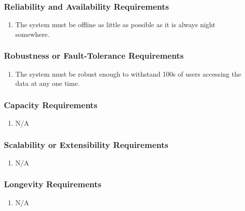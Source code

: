 \documentclass[]{article}
\begin{document}
\begin{enumerate}[{VP}1.]
\subsubsection{Reliability and Availability Requirements}
\label{ssub:reliability_and_availability_requirements}
\begin{enumerate}[{PR}1. ]
	\item The system must be offline as little as possible as it is always night somewhere.
\end{enumerate}

\subsubsection{Robustness or Fault-Tolerance Requirements}
\label{ssub:robustness_or_fault_tolerance_requirements}
\begin{enumerate}[{PR}1. ]
	\item The system must be robust enough to withstand 100s of users accessing the data at any one time.
\end{enumerate}

\subsubsection{Capacity Requirements}
\label{ssub:capacity_requirements}
\begin{enumerate}[{PR}1. ]
	\item N/A
\end{enumerate}

\subsubsection{Scalability or Extensibility Requirements}
\label{ssub:scalability_or_extensibility_requirements}
\begin{enumerate}[{PR}1. ]
	\item N/A
\end{enumerate}

\subsubsection{Longevity Requirements}
\label{ssub:longevity_requirements}
\begin{enumerate}[{PR}1. ]
	\item N/A
\end{enumerate}


\end{enumerate}
\end{document}
